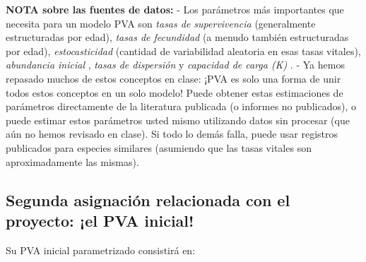 \documentclass[
]{article}
\begin{document}
\textbf{NOTA sobre las fuentes de datos:} - Los parámetros más
importantes que necesita para un modelo PVA son \emph{tasas de
supervivencia } (generalmente estructuradas por edad), \emph{tasas de
fecundidad } (a menudo también estructuradas por edad),
\emph{estocasticidad } (cantidad de variabilidad aleatoria en esas tasas
vitales), \emph{abundancia inicial }, \emph{tasas de dispersión } y
\emph{capacidad de carga (K) }. - Ya hemos repasado muchos de estos
conceptos en clase: ¡PVA es solo una forma de unir todos estos conceptos
en un solo modelo! Puede obtener estas estimaciones de parámetros
directamente de la literatura publicada (o informes no publicados), o
puede estimar estos parámetros usted mismo utilizando datos sin procesar
(que aún no hemos revisado en clase). Si todo lo demás falla, puede usar
registros publicados para especies similares (asumiendo que las tasas
vitales son aproximadamente las mismas).

\hypertarget{segunda-asignaciuxf3n-relacionada-con-el-proyecto-el-pva-inicial}{%
\subsection{Segunda asignación relacionada con el proyecto: ¡el PVA
inicial!}\label{segunda-asignaciuxf3n-relacionada-con-el-proyecto-el-pva-inicial}}

Su PVA inicial parametrizado consistirá en:
\end{document}

